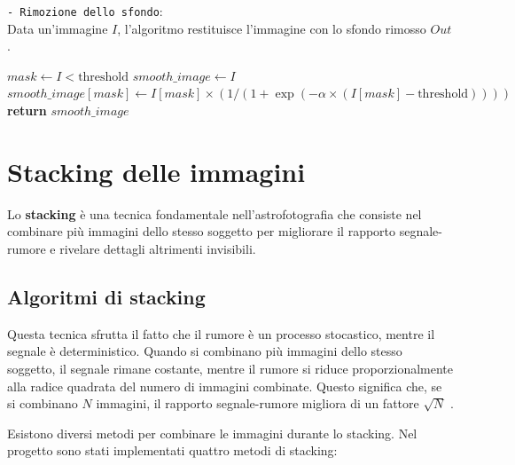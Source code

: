 \begin{algorithm}
    \caption{\texttt{- Rimozione dello sfondo}:\\ Data un'immagine $I$, l'algoritmo restituisce l'immagine con lo sfondo rimosso $Out$.} \label{alg:remove_background}
    \begin{algorithmic}[1]
            \State $mask \gets I < \text{threshold}$ 
            \State $smooth\_image \gets I$
            \State $smooth\_image[mask] \gets I[mask] \times (1 / (1 + \exp(-\alpha \times (I[mask] - \text{threshold}))))$
            \State \textbf{return} $smooth\_image$
        \EndFunction
    \end{algorithmic}
\end{algorithm}

\section{Stacking delle immagini} \label{sec:stacking}

Lo \textbf{stacking} è una tecnica fondamentale nell'astrofotografia che consiste nel combinare più immagini dello stesso soggetto per migliorare il rapporto segnale-rumore e rivelare dettagli altrimenti invisibili.

\subsection{Algoritmi di stacking} \label{subsec:stacking}

Questa tecnica sfrutta il fatto che il rumore è un processo stocastico, mentre il segnale è deterministico. Quando si combinano più immagini dello stesso soggetto, il segnale rimane costante, mentre il rumore si riduce proporzionalmente alla radice quadrata del numero di immagini combinate. Questo significa che, se si combinano $N$ immagini, il rapporto segnale-rumore migliora di un fattore $\sqrt{N}$ \cite{stacking}.

Esistono diversi metodi per combinare le immagini durante lo stacking. Nel progetto sono stati implementati quattro metodi di stacking:

